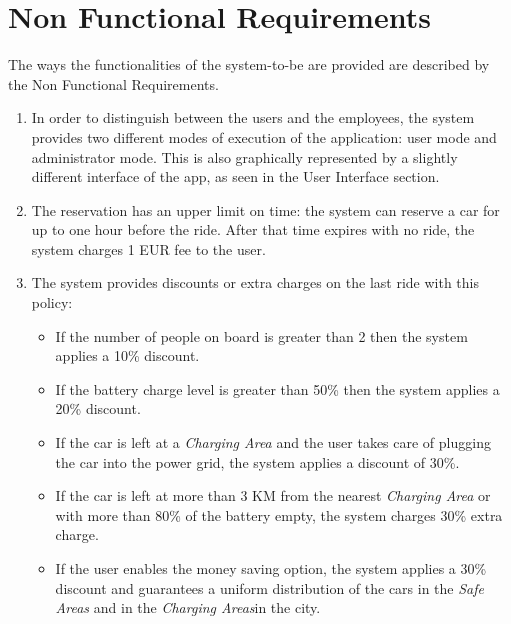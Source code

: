 \documentclass[11pt,a4paper]{report}
\begin{document}
\section{Non Functional Requirements}
The ways the functionalities of the system-to-be are provided are described by the Non Functional Requirements.\\
\begin{enumerate}
\item In order to distinguish between the users and the employees, the system provides two different modes of execution of the application: user mode and administrator mode. This is also graphically represented by a slightly different interface of the app, as seen in the User Interface section.
\item The reservation has an upper limit on time: the system can reserve a car for up to one hour before the ride. After that time expires with no ride, the system charges 1 EUR fee to the user.
\item The system provides discounts or extra charges on the last ride with this policy:
\begin{itemize}
\item If the number of people on board is greater than 2 then the system applies a 10\% discount.
\item If the battery charge level is greater than 50\% then the system applies a 20\% discount.
\item If the car is left at a \textit{Charging Area} and the user takes care of plugging the car into the power grid, the system applies a discount of 30\%.
\item  If the car is left at more than 3 KM from the nearest \textit{Charging Area} or with more than 80\% of the battery empty, the system charges 30\% extra charge.
\item  If the user enables the money saving option, the system applies a 30\% discount and guarantees a uniform distribution of the cars in the \textit{Safe Areas} and in the \textit{Charging Areas}in the city.
\end{itemize}
\end{enumerate}
\end{document}
